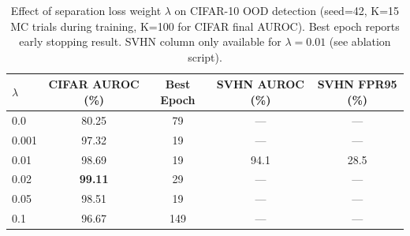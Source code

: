\begin{table}[htbp]
    \centering
    \caption{Effect of separation loss weight $\lambda$ on CIFAR-10 OOD detection
             (seed=42, K=15 MC trials during training, K=100 for CIFAR final AUROC).
             Best epoch reports early stopping result.
             SVHN column only available for $\lambda=0.01$ (see ablation script).}
    \label{tab:separation-loss}
    \begin{tabular}{lcccc}
        \toprule
        $\lambda$ & CIFAR AUROC (\%) & Best Epoch & SVHN AUROC (\%) & SVHN FPR95 (\%) \\
        \midrule
        0.0 & 80.25 & 79 & — & — \\
        0.001 & 97.32 & 19 & — & — \\
        0.01 & 98.69 & 19 & 94.1 & 28.5 \\
        0.02 & \textbf{99.11} & 29 & — & — \\ %
        0.05 & 98.51 & 19 & — & — \\
        0.1 & 96.67 & 149 & — & — \\
        \bottomrule
    \end{tabular}
\end{table}
